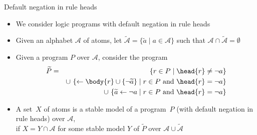 \begin{frame}{Default negation in rule heads}

  \begin{itemize}
    \item<1-3> We consider logic programs with default negation in rule heads
    \item<2-> Given an alphabet $\mathcal{A}$ of atoms,
          let
          \(
          \widetilde{\mathcal{A}}=\{\widetilde{a}\mid a\in\mathcal{A}\}
          \)
          such that $\mathcal{A}\cap\widetilde{\mathcal{A}}=\emptyset$
    \item<3-> Given a program $P$ over $\mathcal{A}$, consider the program
          \begin{eqnarray*}
            \widetilde{P}
            &=&\phantom{\cup\ }
            \{r\in P\mid \head{r}\neq{\neg a}\}
            \\
            &&\cup\
            \{\leftarrow \body{r}\cup\{{\neg \widetilde{a}}\}\mid r\in P \text{ and } \head{r}={\neg a}\}
            \\
            &&\cup\
            \{\widetilde{a}\leftarrow{\neg a}\mid r\in P \text{ and } \head{r}={\neg a}\}
          \end{eqnarray*}
          \smallskip
    \item<4->
          A set~$X$ of atoms is a \alert{stable model} of a program~$P$ (with default negation in rule heads) over $\mathcal{A}$,
          \\
          if $X=Y\cap\mathcal{A}$ for some stable model $Y$ of $\widetilde{P}$ over $\mathcal{A}\cup\widetilde{\mathcal{A}}$
  \end{itemize}
\end{frame}
%
